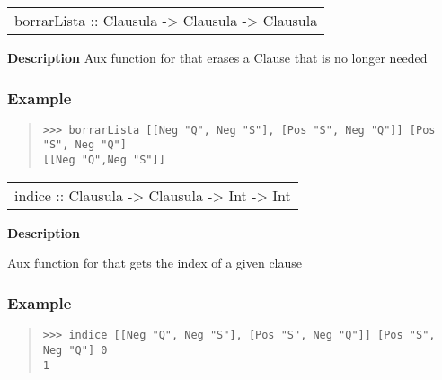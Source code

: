 \begin{haddockdesc}
\item[\begin{tabular}{@{}l}
borrarLista :: {\char 91}Clausula{\char 93} -> Clausula -> {\char 91}Clausula{\char 93}
\end{tabular}]
{\haddockbegindoc
\textbf{Description}
Aux function for  that erases a Clause that is no longer needed\par
\subsubsection*{\textbf{Example}}
\begin{quote}
{\haddockverb\begin{verbatim}
>>> borrarLista [[Neg "Q", Neg "S"], [Pos "S", Neg "Q"]] [Pos "S", Neg "Q"]
[[Neg "Q",Neg "S"]]

\end{verbatim}}
\end{quote}}
\end{haddockdesc}
\begin{haddockdesc}
\item[\begin{tabular}{@{}l}
indice :: {\char 91}Clausula{\char 93} -> Clausula -> Int -> Int
\end{tabular}]
{\haddockbegindoc
\textbf{Description}\par
Aux function for  that gets the index of a given clause\par
\subsubsection*{\textbf{Example}}
\begin{quote}
{\haddockverb\begin{verbatim}
>>> indice [[Neg "Q", Neg "S"], [Pos "S", Neg "Q"]] [Pos "S", Neg "Q"] 0
1

\end{verbatim}}
\end{quote}}
\end{haddockdesc}
